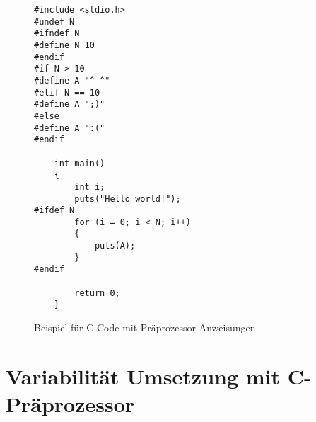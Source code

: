 \lstset{escapechar=@,style=customc}
\begin{figure}[H]
\hspace*{3cm}
\begin{minipage}{\textwidth}
\begin{lstlisting}
#include <stdio.h>
#undef N
#ifndef N
#define N 10
#endif	
#if N > 10
#define A "^-^"
#elif N == 10
#define A ";)"
#else
#define A ":("
#endif
	
	int main()
	{
		int i;
		puts("Hello world!");
#ifdef N
		for (i = 0; i < N; i++)
		{
			puts(A);
		}
#endif
		
		return 0;
	}
\end{lstlisting}
\end{minipage}
%
\caption{Beispiel für C Code mit Präprozessor Anweisungen}
\end{figure}


\section{Variabilität Umsetzung mit C-Präprozessor}

